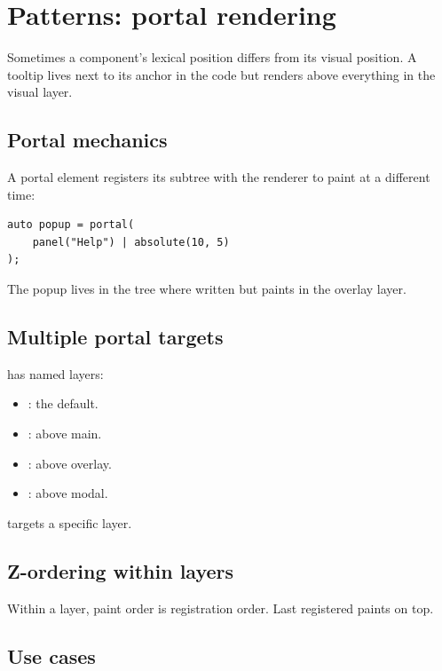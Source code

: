 \chapter{Patterns: portal rendering}
\label{ch:portals}

\begin{aside}
Sometimes a component's lexical position differs from its
visual position. A tooltip lives next to its anchor in the
code but renders above everything in the visual layer.
\end{aside}

\section{Portal mechanics}

A portal element registers its subtree with the renderer
to paint at a different time:

\begin{lstlisting}
auto popup = portal(
    panel("Help") | absolute(10, 5)
);
\end{lstlisting}

The popup lives in the tree where written but paints in
the overlay layer.

\section{Multiple portal targets}

\maya{} has named layers:

\begin{itemize}[leftmargin=*]
  \item {}: the default.
  \item {}: above main.
  \item {}: above overlay.
  \item {}: above modal.
\end{itemize}

 targets a specific
layer.

\section{Z-ordering within layers}

Within a layer, paint order is registration order. Last
registered paints on top.

\section{Use cases}

